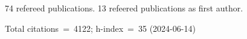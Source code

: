 74 refereed publications. 13 refeered publications as first author.

Total citations~=~4122; h-index~=~35 (2024-06-14)